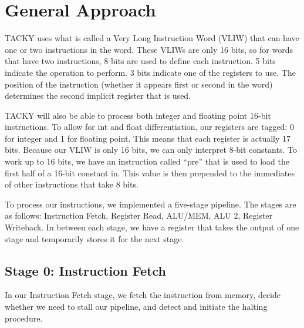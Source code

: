 \documentclass[sigconf]{acmart}
\begin{document}
%

%
\maketitle

\section{General Approach}

TACKY uses what is called a Very Long Instruction Word (VLIW) that can have one or two instructions in the word. These VLIWs are only 16 bits, so for words that have two instructions, 8 bits are used to define each instruction. 5 bits indicate the operation to perform. 3 bits indicate one of the registers to use. The position of the instruction (whether it appears first or second in the word) determines the second implicit register that is used.

TACKY will also be able to process both integer and floating point 16-bit instructions. To allow for int and float differentiation, our registers are tagged: 0 for integer and 1 for floating point. This means that each register is actually 17 bits. Because our VLIW is only 16 bits, we can only interpret 8-bit constants. To work up to 16 bits, we have an instruction called “pre” that is used to load the first half of a 16-bit constant in. This value is then prepended to the immediates of other instructions that take 8 bits.

To process our instructions, we implemented a five-stage pipeline. The stages are as follows: Instruction Fetch, Register Read, ALU/MEM, ALU 2, Register Writeback. In between each stage, we have a register that takes the output of one stage and temporarily stores it for the next stage. 

\subsection{Stage 0: Instruction Fetch}
In our Instruction Fetch stage, we fetch the instruction from memory, decide whether we need to stall our pipeline, and detect and initiate the halting procedure.
\end{document}

